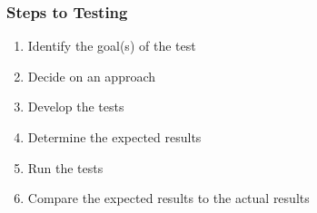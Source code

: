 \subsubsection{Steps to Testing \citep[p.~443]{PetersAndPedrycz2000}}
\begin{enumerate}
      \item Identify the goal(s) of the test
      \item Decide on an approach
      \item Develop the tests
      \item Determine the expected results
      \item Run the tests
      \item Compare the expected results to the actual results
\end{enumerate}

